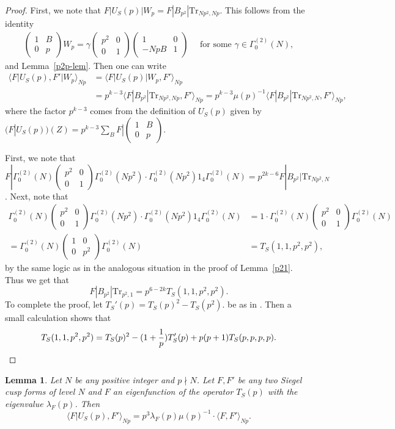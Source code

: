 \documentclass[11pt]{amsart}
\numberwithin{equation}{section}
\theoremstyle{plain}
\newtheorem{lem}[thm]{Lemma}
\theoremstyle{definition}
\newcommand{\lemref}[1]{Lemma~\ref{#1}}
\newcommand{\mrm}{\mathrm}
\newcommand{\lan}{\langle }
\newcommand{\ran}{\rangle}
\newcommand{\q}{\quad}
\newcommand{\smat}[4]{\left( \begin{smallmatrix}#1&#2\\#3&#4\end{smallmatrix}\right)}
\begin{document}
\begin{proof}
 First, we note that $F|U_S(p)|W_p= F|B_{p^2}| \mrm{Tr}_{Np^2,Np} $. This follows from the identity
 \begin{align}
     \smat{1}{B}{0}{p} W_p = \gamma\smat{p^2}{0}{0}{1} \smat{1}{0}{-NpB}{1} \q \text{ for some } \gamma\in \Gamma^{(2)}_0(N),
 \end{align}
and \lemref{p2p-lem}. Then one can write
\begin{align}
    \lan F|U_S(p), F'|W_p \ran_{Np} &= \lan F|U_S(p)|W_p, F' \ran_{Np}   \\
    &=   p^{k-3} \lan F|B_{p^2}| \mrm{Tr}_{Np^2,Np} , F' \ran_{Np} = p^{k-3}\mu(p)^{-1}  \lan F|B_{p^2}| \mrm{Tr}_{Np^2,N} , F' \ran_{Np}  ,
\end{align}
where the factor $p^{k-3}$ comes from the definition of $U_S(p)$ given by $(F|U_S(p))(Z)= p^{k-3}\sum_{B} F|\smat{1}{B}{0}{p}$.

First, we note that $F|\Gamma^{(2)}_0(N) \smat{p^2}{0}{0}{1} \Gamma^{(2)}_0(Np^2) \cdot \Gamma^{(2)}_0(Np^2) 1_4 \Gamma^{(2)}_0(N)= p^{2k-6} F|B_{p^2}|\mrm{Tr}_{Np^2,N}$. Next, note that
\begin{align}
\Gamma^{(2)}_0(N) \smat{p^2}{0}{0}{1} \Gamma^{(2)}_0(Np^2) \cdot \Gamma^{(2)}_0(Np^2) 1_4 \Gamma^{(2)}_0(N)&= 1 \cdot \Gamma^{(2)}_0(N) \smat{p^2}{0}{0}{1} \Gamma^{(2)}_0(N) \\
= \Gamma^{(2)}_0(N)\smat{1}{0}{0}{p^2} \Gamma^{(2)}_0(N)&=  T_S(1,1,p^2,p^2),
\end{align}
by the same logic as in the analogous situation in the proof of \lemref{p21}. Thus we get that
\begin{equation}
    F|B_{p^2}| \mrm{Tr}_{p^2,1}= p^{6-2k} T_S(1,1,p^2,p^2).
\end{equation}
To complete the proof, let 
$T_S'(p)=T_S(p)^2-T_S(p^2)$.
be as in \cite{Ibu-SK}. Then a small calculation shows that
\begin{equation} \label{Ts11p2p2}
    T_S(1,1,p^2,p^2) = T_S(p)^2- (1+\frac{1}{p})T'_S(p) +p(p+1) T_S(p,p,p,p). \qedhere
\end{equation}
\end{proof}
\begin{lem}\label{L1up}
     Let $N$ be any positive integer and $p\nmid N$. Let $F,F'$ be any two Siegel cusp forms of level $N$ and $F$ an eigenfunction of the operator $T_S(p)$ with the eigenvalue $\lambda_F(p)$. Then 
     \begin{equation}
         \lan F|U_S(p), F' \ran_{Np} =p^3\lambda_{F}(p)\mu(p)^{-1}\cdot \lan F,F'\ran_{Np}.
     \end{equation}
\end{lem}
\end{document}
